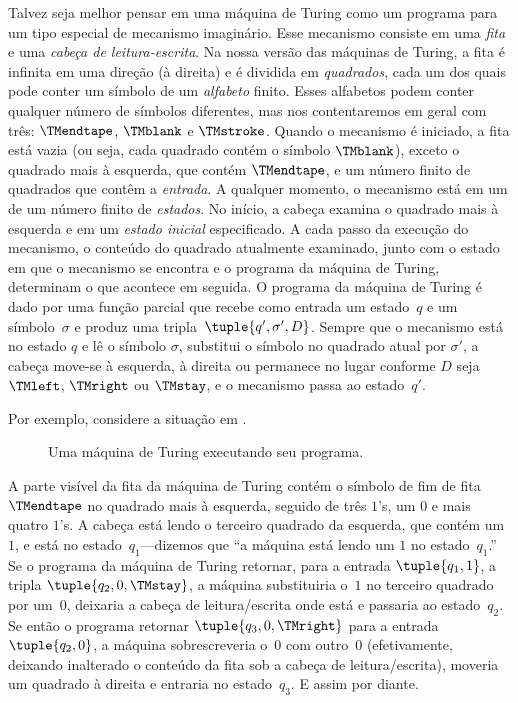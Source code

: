 \documentclass[../../../include/open-logic-section]{subfiles}
\begin{document}
\begin{explain}
Talvez seja melhor pensar em uma máquina de Turing
como um programa para um tipo especial de mecanismo imaginário. Esse
mecanismo consiste em uma \emph{fita} e uma \emph{cabeça de leitura-escrita}. Na
nossa versão das máquinas de Turing, a fita é infinita em uma direção
(à direita) e é dividida em \emph{quadrados}, cada um dos quais
pode conter um símbolo de um \emph{alfabeto} finito. Esses alfabetos podem
conter qualquer número de símbolos diferentes, mas nos contentaremos em geral
com três: $\TMendtape$, $\TMblank$ e $\TMstroke$. Quando o
mecanismo é iniciado, a fita está vazia (ou seja, cada quadrado contém
o símbolo $\TMblank$), exceto o quadrado mais à esquerda, que contém
$\TMendtape$, e um número finito de quadrados que contêm a
\emph{entrada}. A qualquer momento, o mecanismo está em um de um número finito de
\emph{estados}. No início, a cabeça examina o quadrado mais à esquerda
e em um \emph{estado inicial} especificado. A cada passo da
execução do mecanismo, o conteúdo do quadrado atualmente examinado, junto
com o estado em que o mecanismo se encontra e o programa da máquina de Turing,
determinam o que acontece em seguida. O programa da máquina de Turing é dado por uma
função parcial que recebe como entrada um estado~$q$ e um
símbolo~$\sigma$ e produz uma tripla~$\tuple{q', \sigma',
  D}$. Sempre que o mecanismo está no estado $q$ e lê o símbolo
$\sigma$, substitui o símbolo no quadrado atual por $\sigma'$, a cabeça move-se à esquerda, à direita ou permanece no lugar conforme $D$ seja
$\TMleft$, $\TMright$ ou $\TMstay$, e o mecanismo passa ao
estado~$q'$.

Por exemplo, considere a situação em .
\begin{figure}
  \caption{Uma máquina de Turing executando seu programa.}
\end{figure}
A parte visível da fita da máquina de Turing contém o
símbolo de fim de fita $\TMendtape$ no quadrado mais à esquerda, seguido de
três $1$'s, um $0$ e mais quatro $1$'s. A
cabeça está lendo o terceiro quadrado da esquerda, que contém
um~$1$, e está no estado~$q_1$---dizemos que ``a máquina está lendo
um $1$ no estado~$q_1$.'' Se o programa da máquina de Turing
retornar, para a entrada $\tuple{q_1, 1}$, a tripla $\tuple{q_2,
0, \TMstay}$, a máquina substituiria o~$1$ no
terceiro quadrado por um~$0$, deixaria a cabeça de leitura/escrita onde está
e passaria ao estado~$q_2$. Se então o programa retornar
$\tuple{q_3, 0, \TMright}$ para a entrada $\tuple{q_2, 0}$,
a máquina sobrescreveria o~$0$ com outro~$0$
(efetivamente, deixando inalterado o conteúdo da fita sob a cabeça de leitura/escrita), moveria um quadrado à direita e entraria no estado~$q_3$.
E assim por diante.


\end{explain}
\end{document}
